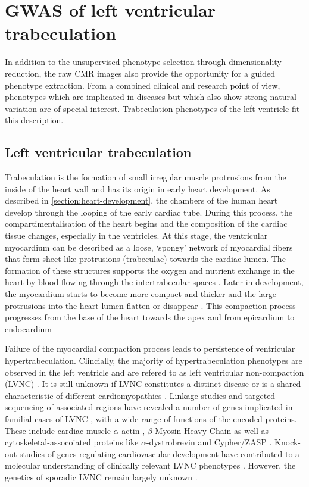 \chapter{GWAS of left ventricular trabeculation}
\label{chapter:GWAS-FD}
In addition to the unsupervised phenotype selection through dimensionality reduction, the raw CMR images also provide the opportunity for a guided phenotype extraction. From a combined clinical and research point of view, phenotypes which are implicated in diseases but which also show strong natural variation are of special interest. Trabeculation phenotypes of the left ventricle fit this description.

\section{Left ventricular trabeculation}
\label{section:intro-FD}
Trabeculation is the formation of small irregular muscle protrusions from the inside of the heart wall and has its origin in early heart development. As described in \cref{section:heart-development}, the chambers of the human heart develop through the looping of the early cardiac tube. During this process, the compartimentalisation of the heart begins and the composition of the cardiac tissue changes, especially in the ventricles. At this stage, the ventricular myocardium can be described as a loose, `spongy' network of myocardial fibers that form sheet-like protrusions (trabeculae) towards the cardiac lumen. The formation of these structures supports the oxygen and nutrient exchange in the heart \citep{Chen2009} by blood flowing through the intertrabecular spaces \citep{Zambrano2002}. Later in development, the myocardium starts to become more compact and thicker and the large protrusions into the heart lumen flatten or disappear \citep{Yousef2009}. This compaction process progresses from the base of the heart towards the apex and from epicardium to endocardium \citep{Zambrano2002}

Failure of the myocardial compaction process leads to persistence of ventricular hypertrabeculation. Clincially, the majority of hypertrabeculation phenotypes are observed in the left ventricle and are refered to as left ventricular non-compaction (LVNC) \citep{Zambrano2002}. It is still unknown if LVNC constitutes a distinct disease or is a shared characteristic of different cardiomyopathies \citep{Captur2013}. Linkage studies and targeted sequencing of associated regions have revealed a number of genes implicated in familial cases of LVNC \citep{Bleyl1997,Klaassen2008,Moric-Janiszewska2008}, with a wide range of functions of the encoded proteins. These include cardiac muscle \(\alpha\) actin \citep{Monserrat2007}, 
\(\beta\)-Myosin Heavy Chain \citep{Budde2007} as well as cytoskeletal-assocoiated proteins like \(\alpha\)-dystrobrevin \citep{Ichida2001} and Cypher/ZASP \citep{Vatta2003}. Knock-out studies of genes regulating cardiovascular development have contributed to a molecular understanding of clinically relevant LVNC phenotypes \citep{Chen2009,Mysliwiec2011}. However, the genetics of sporadic LVNC remain largely unknown \citep{Zambrano2002}.

